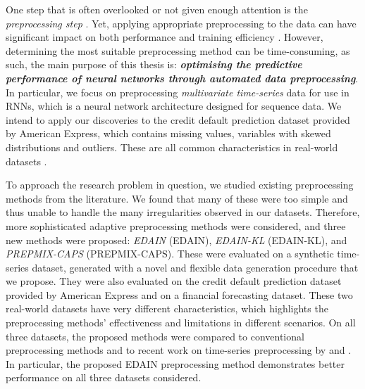 \documentclass{statsmsc}
\begin{document}
{%
One step that is often overlooked or not given enough attention is the
\textit{preprocessing step} \citep{stanislav}. Yet, applying appropriate
preprocessing to the data can have significant impact on both performance and
training efficiency \citep{preprocess_origin,nawi,singh,dain,bin,mixture_ct}.
However, determining the most suitable preprocessing method can be time-consuming,
as such, the main purpose of this thesis is: \textit{\textbf{optimising the
predictive performance of neural networks through automated data preprocessing}}.  In
particular, we focus on preprocessing \textit{multivariate time-series} data for use
in \acp{RNN}, which is a neural network architecture designed for sequence data.
We intend to apply our discoveries to the credit default prediction dataset
provided by American Express, which
contains missing values, variables with skewed distributions and outliers. These are all
common characteristics in real-world datasets \citep{nawi,brits}.

To approach the research problem in question, we studied existing preprocessing methods
from the literature. We found that many of these were too simple and thus unable to handle
the many irregularities observed in our datasets. Therefore, more sophisticated adaptive
preprocessing methods were considered, and three new methods were proposed:
\textit{\acl{EDAIN}} (\acs{EDAIN}), \textit{\acl{EDAIN-KL}} (\acs{EDAIN-KL}),
and \textit{\acl{PREPMIX-CAPS}} (\acs{PREPMIX-CAPS}).
These were evaluated on a synthetic time-series dataset, generated with a
novel and flexible data generation procedure that we propose.
They were also evaluated on the credit default prediction dataset provided by American
Express and on a financial forecasting dataset. These two real-world datasets have
very different characteristics, which highlights the preprocessing methods' effectiveness and
limitations in different scenarios. 
On all three datasets, the proposed methods were compared to conventional preprocessing methods and 
to recent work on time-series preprocessing by \cite{dain} and \cite{bin}. In particular,
the proposed \acs{EDAIN} preprocessing method demonstrates
better performance on all three datasets considered.

}
\end{document}
